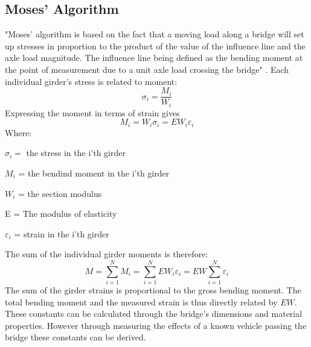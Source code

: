 \subsection{Moses' Algorithm}
"Moses' algorithm is based on the fact that a moving load along a bridge will set up stresses in proportion to the product of the value of the influence line and the axle load magnitude. The influence line being defined as the bending moment at the point of measurement due to a unit axle load crossing the bridge" \cite[p.~35]{Quilligan}.
Each individual girder's stress is related to moment:
\begin{equation}
\sigma_{i} = \frac{M_i}{W_i}
\end{equation}
Expressing the moment in terms of strain gives
\begin{equation}
M_{i} = W_{i} \sigma_{i} = E W_{i}  \varepsilon_{i}
\end{equation}
Where:
\begin{description}
	\item $\sigma_{i} = $ the stress in the i'th girder
	\item $ M_i $ = the bendind moment in the i'th girder
	\item $ W_i $ = the section modulus
\end{description}
\begin{description}
	\item E =  The modulus of elasticity
	\item $ \varepsilon_i $ = strain in the i'th girder
\end{description}
The sum of the individual girder moments is therefore:
\begin{equation}
M = \sum_{i = 1}^{N} M_i = \sum_{i = 1}^{N} EW_i \varepsilon_i = EW \sum_{i = 1}^{N} \varepsilon_i
\label{equation:moment_strain}
\end{equation}
The sum of the girder strains is proportional to the gross bending moment. The total bending moment and the measured strain is thus directly related by $EW$. These constants can be calculated through the bridge's dimensions and material properties. However through measuring the effects of a known vehicle passing the bridge these constants can be derived.

